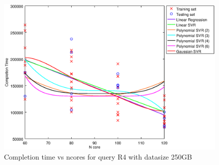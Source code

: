 
\begin {figure}[hbtp]
\centering
\includegraphics[width=\textwidth]{output/R4_250_ONLY_1_LINEAR_NCORE/plot_R4_250.eps}
\caption{Completion time vs ncores for query R4 with datasize 250GB}
\label{fig:only_1_linear_R4_250}
\end {figure}
